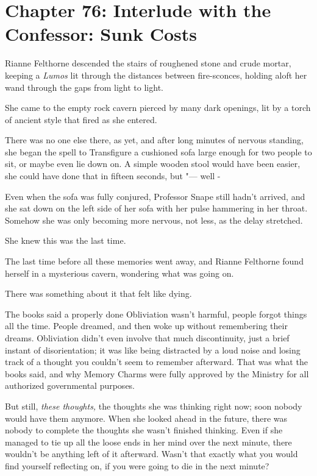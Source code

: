 \chapter{Chapter 76: Interlude with the Confessor: Sunk Costs}
Rianne Felthorne descended the stairs of roughened stone and crude
mortar, keeping a \emph{Lumos} lit through the distances between
fire-sconces, holding aloft her wand through the gaps from light to
light.

She came to the empty rock cavern pierced by many dark openings, lit by
a torch of ancient style that fired as she entered.

There was no one else there, as yet, and after long minutes of nervous
standing, she began the spell to Transfigure a cushioned sofa large
enough for two people to sit, or maybe even lie down on. A simple wooden
stool would have been easier, she could have done that in fifteen
seconds, but "--- well -

Even when the sofa was fully conjured, Professor Snape still hadn't
arrived, and she sat down on the left side of her sofa with her pulse
hammering in her throat. Somehow she was only becoming more nervous, not
less, as the delay stretched.

She knew this was the last time.

The last time before all these memories went away, and Rianne Felthorne
found herself in a mysterious cavern, wondering what was going on.

There was something about it that felt like dying.

The books said a properly done Obliviation wasn't harmful, people forgot
things all the time. People dreamed, and then woke up without
remembering their dreams. Obliviation didn't even involve that much
discontinuity, just a brief instant of disorientation; it was like being
distracted by a loud noise and losing track of a thought you couldn't
seem to remember afterward. That was what the books said, and why Memory
Charms were fully approved by the Ministry for all authorized
governmental purposes.

But still, \emph{these thoughts,} the thoughts she was thinking right
now; soon nobody would have them anymore. When she looked ahead in the
future, there was nobody to complete the thoughts she wasn't finished
thinking. Even if she managed to tie up all the loose ends in her mind
over the next minute, there wouldn't be anything left of it afterward.
Wasn't that exactly what you would find yourself reflecting on, if you
were going to die in the next minute?


